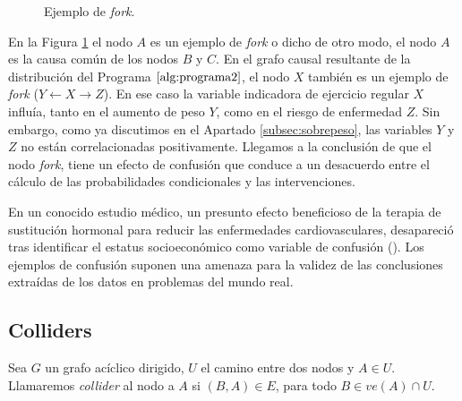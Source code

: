 \documentclass[oneside,openright,titlepage,numbers=noenddot,openany,headinclude,footinclude=true,
cleardoublepage=empty,abstractoff,BCOR=5mm,paper=a4,fontsize=12pt,main=spanish]{scrreprt}
\begin{document}
\begin{figure}[h]
\centering
{}
\caption{Ejemplo de \textit{fork}.}
\label{fig:fork}
\end{figure}

\clearpage

En la Figura \ref{fig:fork} el nodo $A$ es un ejemplo de \textit{fork} o dicho de otro modo, el nodo $A$ es la causa común de los nodos $B$ y $C$. En el grafo causal resultante de la distribución del Programa $\ref{alg:programa2}$, el nodo $X$ también es un ejemplo de \textit{fork} ($Y \leftarrow X \to Z$). En ese caso la variable indicadora de ejercicio regular $X$ influía, tanto en el aumento de peso $Y$, como en el riesgo de enfermedad $Z$. Sin embargo, como ya discutimos en el Apartado \ref{subsec:sobrepeso}, las variables $Y$ y $Z$ no están correlacionadas positivamente. Llegamos a la conclusión de que el nodo \textit{fork}, tiene un efecto de confusión que conduce a un desacuerdo entre el cálculo de las probabilidades condicionales y las intervenciones. 

\begin{example}
En un conocido estudio médico, un presunto efecto beneficioso de la terapia de sustitución hormonal para reducir las enfermedades cardiovasculares, desapareció tras identificar el estatus socioeconómico como variable de confusión (\cite{ejconfusion2002}). Los ejemplos de confusión suponen una amenaza para la validez de las conclusiones extraídas de los datos en problemas del mundo real.
\end{example}

\subsection{Colliders}

\begin{definition} 
Sea $G$ un grafo acíclico dirigido, $U$ el camino entre dos nodos y $A\in U$. Llamaremos \textit{collider} al nodo a $A$ si $(B,A)\in E$, para todo $B\in ve(A) \cap U$.
\end{definition}
\end{document}

